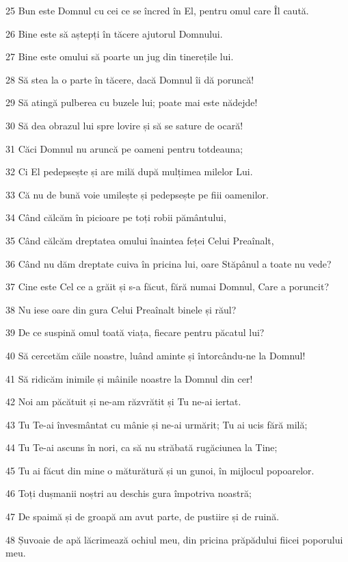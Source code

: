\par 25 Bun este Domnul cu cei ce se încred în El, pentru omul care Îl caută.
\par 26 Bine este să aștepți în tăcere ajutorul Domnului.
\par 27 Bine este omului să poarte un jug din tinerețile lui.
\par 28 Să stea la o parte în tăcere, dacă Domnul îi dă poruncă!
\par 29 Să atingă pulberea cu buzele lui; poate mai este nădejde!
\par 30 Să dea obrazul lui spre lovire și să se sature de ocară!
\par 31 Căci Domnul nu aruncă pe oameni pentru totdeauna;
\par 32 Ci El pedepsește și are milă după mulțimea milelor Lui.
\par 33 Că nu de bună voie umilește și pedepsește pe fiii oamenilor.
\par 34 Când călcăm în picioare pe toți robii pământului,
\par 35 Când călcăm dreptatea omului înaintea feței Celui Preaînalt,
\par 36 Când nu dăm dreptate cuiva în pricina lui, oare Stăpânul a toate nu vede?
\par 37 Cine este Cel ce a grăit și s-a făcut, fără numai Domnul, Care a poruncit?
\par 38 Nu iese oare din gura Celui Preaînalt binele și răul?
\par 39 De ce suspină omul toată viața, fiecare pentru păcatul lui?
\par 40 Să cercetăm căile noastre, luând aminte și întorcându-ne la Domnul!
\par 41 Să ridicăm inimile și mâinile noastre la Domnul din cer!
\par 42 Noi am păcătuit și ne-am răzvrătit și Tu ne-ai iertat.
\par 43 Tu Te-ai învesmântat cu mânie și ne-ai urmărit; Tu ai ucis fără milă;
\par 44 Tu Te-ai ascuns în nori, ca să nu străbată rugăciunea la Tine;
\par 45 Tu ai făcut din mine o măturătură și un gunoi, în mijlocul popoarelor.
\par 46 Toți dușmanii noștri au deschis gura împotriva noastră;
\par 47 De spaimă și de groapă am avut parte, de pustiire și de ruină.
\par 48 Șuvoaie de apă lăcrimează ochiul meu, din pricina prăpădului fiicei poporului meu.
